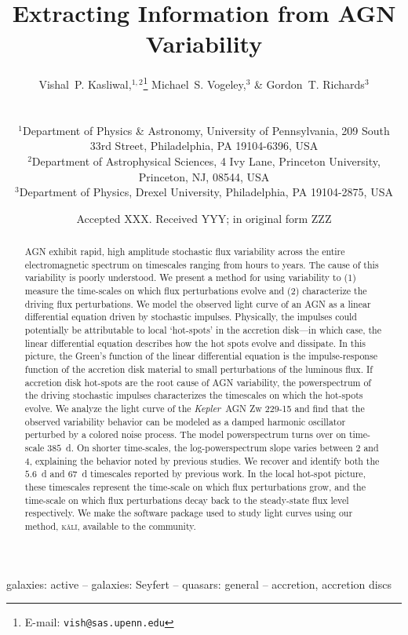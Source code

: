 \documentclass[a4paper,fleqn,usenatbib]{mnras}
\title[Extracting Information from AGN Variability]{Extracting Information from AGN Variability}
\author[V.~P. Kasliwal et al.]{
\parbox{\textwidth}{
Vishal~P. Kasliwal,$^{1,2}$\thanks{E-mail: \texttt{vish@sas.upenn.edu}}
Michael~S. Vogeley,$^{3}$
\& Gordon~T. Richards$^{3}$}\vspace{0.4cm}\
\\
\parbox{\textwidth}{
$^{1}$Department of Physics \& Astronomy, University of Pennsylvania, 209 South 33rd Street, Philadelphia, PA 19104-6396, USA\\
$^{2}$Department of Astrophysical Sciences, 4 Ivy Lane, Princeton University, Princeton, NJ, 08544, USA\\
$^{3}$Department of Physics, Drexel University, Philadelphia, PA 19104-2875, USA\\
}
}
\date{Accepted XXX. Received YYY; in original form ZZZ}
\newcommand{\Kepler}{\textit{Kepler~}}
\begin{document}
\label{firstpage}
\pagerange{\pageref{firstpage}--\pageref{lastpage}}
\maketitle

\begin{abstract}
AGN exhibit rapid, high amplitude stochastic flux variability across the entire electromagnetic spectrum on timescales ranging from hours to years. The cause of this variability is poorly understood. We present a method for using variability to (1) measure the time-scales on which flux perturbations evolve and (2) characterize the driving flux perturbations. We model the observed light curve of an AGN as a linear differential equation driven by stochastic impulses. Physically, the impulses could potentially be attributable to local `hot-spots' in the accretion disk---in which case, the linear differential equation describes how the hot spots evolve and dissipate. In this picture, the Green's function of the linear differential equation is the impulse-response function of the accretion disk material to small perturbations of the luminous flux. If accretion disk hot-spots are the root cause of AGN variability, the powerspectrum of the driving stochastic impulses characterizes the timescales on which the hot-spots evolve. We analyze the light curve of the \Kepler AGN Zw 229-15 and find that the observed variability behavior can be modeled as a damped harmonic oscillator perturbed by a colored noise process. The model powerspectrum turns over on time-scale $385$~d. On shorter time-scales, the log-powerspectrum slope varies between $2$ and $4$, explaining the behavior noted by previous studies. We recover and identify both the $5.6$~d and $67$~d timescales reported by previous work. In the local hot-spot picture, these timescales represent the time-scale on which flux perturbations grow, and the time-scale on which flux perturbations decay back to the steady-state flux level respectively. We make the software package used to study light curves using our method, \textsc{k\={a}l\={i}}, available to the community.
\end{abstract}

\begin{keywords}
galaxies: active -- galaxies: Seyfert -- quasars: general -- accretion, accretion discs
\end{keywords}
\end{document}
